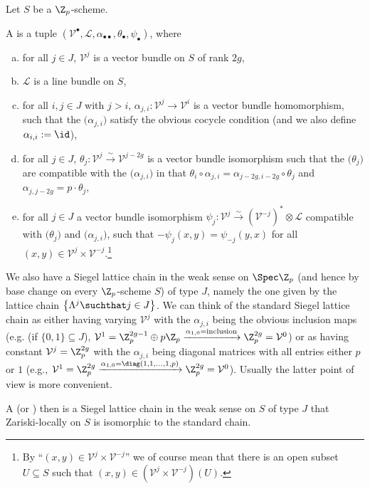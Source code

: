 \documentclass[a4paper]{scrartcl} %
\numberwithin{equation}{section}
\begin{document}
\begin{Definition}\label{siegel-chain}
  Let $S$ be a $\Z_p$-scheme.
  
  A  is a tuple $(\mathcal{V}^\bullet,\mathcal{L},\alpha_{\bullet\bullet},\theta_\bullet,\psi_\bullet)$, where
  \begin{enumerate}[(a)]
  \item for all $j\in J$, $\mathcal{V}^j$ is a vector bundle on $S$ of rank $2g$,
  \item $\mathcal{L}$ is a line bundle on $S$,
  \item for all $i,j\in J$ with $j>i$, $\alpha_{j,i}\colon \mathcal{V}^j\to \mathcal{V}^i$ is a vector bundle homomorphism, such that the $\bigl(\alpha_{j,i}\bigr)$ satisfy the obvious cocycle condition (and we also define $\alpha_{i,i}:=\id$),
  \item for all $j\in J$, $\theta_j\colon \mathcal{V}^j \xrightarrow{\sim} \mathcal{V}^{j-2g}$ is a vector bundle isomorphism such that the $\bigl(\theta_j\bigr)$ are compatible with the $\bigl(\alpha_{j,i}\bigr)$ in that $\theta_i\circ\alpha_{j,i}=\alpha_{j-2g,i-2g}\circ\theta_j$ and $\alpha_{j,j-2g}=p\cdot\theta_j$,
  \item \label{item:siegel-chain-pol} for all $j\in J$ a vector bundle isomorphism $\psi_j\colon \mathcal{V}^j \xrightarrow{\sim} (\mathcal{V}^{-j})^*\otimes\mathcal{L}$ compatible with $\bigl(\theta_j\bigr)$ and $\bigl(\alpha_{j,i}\bigr)$, such that $-\psi_j(x,y) = \psi_{-j}(y,x)$  for all $(x,y)\in \mathcal{V}^j\times \mathcal{V}^{-j}$.\footnote{By ``$(x,y)\in \mathcal{V}^j\times \mathcal{V}^{-j}$'' we of course mean that there is an open subset $U\subseteq S$ such that $(x,y)\in(\mathcal{V}^j\times \mathcal{V}^{-j})(U)$.}
  \end{enumerate}

  We also have a  Siegel lattice chain in the weak sense on $\Spec\Z_p$ (and hence by base change on every $\Z_p$-scheme $S$) of type $J$, namely the one given by the lattice chain $\left\{\Lambda^j \suchthat j\in J\right\}$. We can think of the standard Siegel lattice chain as either having varying $\mathcal{V}^j$ with the $\alpha_{j,i}$ being the obvious inclusion maps (e.g. (if $\{0,1\}\subseteq J$), $\mathcal{V}^1={\Z_p^{2g-1}\oplus p\Z_p} \xrightarrow{\alpha_{1,0}=\mathrm{inclusion}} \Z_p^{2g}=\mathcal{V}^0$) or as having constant $\mathcal{V}^j=\Z_p^{2g}$ with the $\alpha_{j,i}$ being diagonal matrices with all entries either $p$ or $1$ (e.g., $\mathcal{V}^1=\Z_p^{2g} \xrightarrow{\alpha_{1,0}=\diag(1,1,\dotsc,1,p)} \Z_p^{2g}=\mathcal{V}^0$). Usually the latter point of view is more convenient.

  A  (or ) then is a Siegel lattice chain in the weak sense on $S$ of type $J$ that Zariski-locally on $S$ is isomorphic to the standard chain.
\end{Definition}
\end{document}
